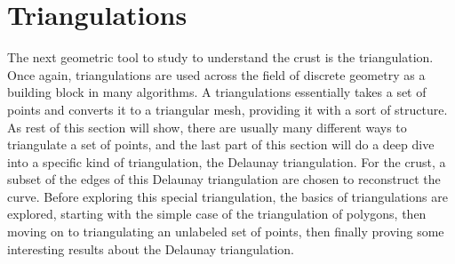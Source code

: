 \clearpage
\newpage
\section{Triangulations}
The next geometric tool to study to understand the crust is the triangulation.
Once again, triangulations are used across the field of discrete geometry as a building block in many algorithms.
A triangulations essentially takes a set of points and converts it to a triangular mesh, providing it with a sort of structure.
As rest of this section will show, there are usually many different ways to triangulate a set of points, and the last part of this section will do a deep dive into a specific kind of triangulation, the Delaunay triangulation.
For the crust, a subset of the edges of this Delaunay triangulation are chosen to reconstruct the curve.
Before exploring this special triangulation, the basics of triangulations are explored, starting with the simple case of the triangulation of polygons, then moving on to triangulating an unlabeled set of points, then finally proving some interesting results about the Delaunay triangulation.






